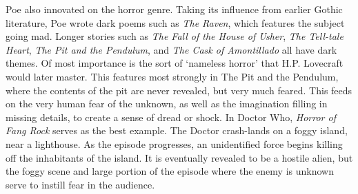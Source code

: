\documentclass[12pt]{article}
\begin{document}
Poe also innovated on the horror genre. Taking its influence from earlier
Gothic literature, Poe wrote dark poems such as \emph{The Raven}, which
features the subject going mad. Longer stories such as \emph{The Fall of the
House of Usher}, \emph{The Tell-tale Heart}, \emph{The Pit and the Pendulum},
and \emph{The Cask of Amontillado} all have dark themes. Of most importance is
the sort of `nameless horror' that H.P.  Lovecraft would later master. This
features most strongly in The Pit and the Pendulum, where the contents of the
pit are never revealed, but very much feared. This feeds on the very human
fear of the unknown, as well as the imagination filling in missing details, to
create a sense of dread or shock. In Doctor Who, \emph{Horror of Fang Rock}
serves as the best example. The Doctor crash-lands on a foggy island, near a
lighthouse. As the episode progresses, an unidentified force begins killing
off the inhabitants of the island. It is eventually revealed to be a hostile
alien, but the foggy scene and large portion of the episode where the enemy is
unknown serve to instill fear in the audience.
\end{document}

